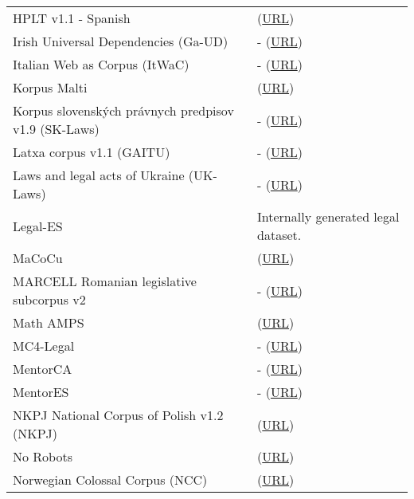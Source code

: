 \begin{longtable}{p{} | p{}}
    HPLT v1.1 - Spanish  & \citet{de_gibert_new_2024} (\href{https://hplt-project.org/datasets/v1.1}{URL}) \\ 
    Irish Universal Dependencies (Ga-UD) & - (\href{https://universaldependencies.org/ga/index.html}{URL}) \\ 
    Italian Web as Corpus (ItWaC) & - (\href{https://docs.sslmit.unibo.it/doku.php?id=corpora:itwac}{URL}) \\ 
    Korpus Malti & \citet{micallef_pre-training_2022} (\href{https://huggingface.co/datasets/MLRS/korpus\_malti}{URL}) \\ 
    Korpus slovenských právnych predpisov v1.9 (SK-Laws) & - (\href{https://www.juls.savba.sk/data.html}{URL}) \\ 
    Latxa corpus v1.1 (GAITU) & - (\href{https://huggingface.co/datasets/HiTZ/latxa-corpus-v1.1}{URL}) \\ 
    Laws and legal acts of Ukraine (UK-Laws) & - (\href{https://lang.org.ua/en/corpora/\#anchor7}{URL}) \\ 
    Legal-ES & Internally generated legal dataset. \\ 
    MaCoCu & \citet{banon_macocu_2022} (\href{https://macocu.eu/}{URL}) \\ 
    MARCELL Romanian legislative subcorpus v2 & - (\href{https://elrc-share.eu/repository/browse/marcell-romanian-legislative-subcorpus-v2/2da548428b9d11eb9c1a00155d026706ce94a6b59ffc4b0e9fb5cd9cebe6889e/}{URL}) \\ 
    Math AMPS & \citet{hendrycks_measuring_2021} (\href{https://github.com/hendrycks/math}{URL}) \\ 
    MC4-Legal & - (\href{https://huggingface.co/datasets/joelito/legal-mc4}{URL}) \\ 
    MentorCA & - (\href{https://huggingface.co/datasets/projecte-aina/MentorCA}{URL}) \\ 
    MentorES & - (\href{https://huggingface.co/datasets/projecte-aina/MentorES}{URL}) \\ 
    NKPJ National Corpus of Polish v1.2 (NKPJ) & \citet{lewandowska-tomaszczyk_national_2013} (\href{https://clip.ipipan.waw.pl/NationalCorpusOfPolish}{URL}) \\ 
    No Robots & \citet{rajani_norobots_2023} (\href{https://huggingface.co/datasets/HuggingFaceH4/no_robots}{URL}) \\ 
    Norwegian Colossal Corpus (NCC) & \citet{kummervold_operationalizing_2021} (\href{https://huggingface.co/datasets/NbAiLab/NCC}{URL}) \\ 

\end{longtable}
